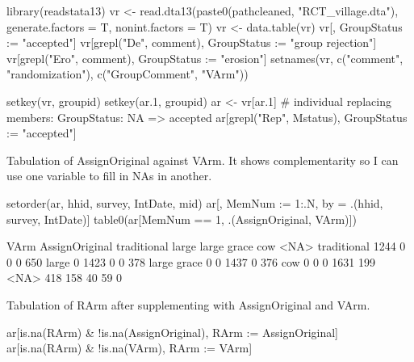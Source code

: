 \begin{Schunk}
\begin{Sinput}
library(readstata13)
vr <- read.dta13(paste0(pathcleaned, "RCT_village.dta"), 
  generate.factors = T, nonint.factors = T)
vr <- data.table(vr)
vr[, GroupStatus := "accepted"]
vr[grepl("De", comment), GroupStatus := "group rejection"]
vr[grepl("Ero", comment), GroupStatus := "erosion"]
setnames(vr, c("comment", "randomization"), c("GroupComment", "VArm"))
\end{Sinput}
\end{Schunk}
\begin{Schunk}
\end{Schunk}
\begin{Schunk}
\begin{Sinput}
setkey(vr, groupid)
setkey(ar.1, groupid)
ar <- vr[ar.1]
# individual replacing members: GroupStatus: NA => accepted
ar[grepl("Rep", Mstatus), GroupStatus := "accepted"]
\end{Sinput}
\end{Schunk}
Tabulation of \textsf{AssignOriginal} against \textsf{VArm}. It shows complementarity so I can use one variable to fill in NAs in another.
\begin{Schunk}
\begin{Sinput}
setorder(ar, hhid, survey, IntDate, mid)
ar[, MemNum := 1:.N, by = .(hhid, survey, IntDate)]
table0(ar[MemNum == 1, .(AssignOriginal, VArm)])
\end{Sinput}
\begin{Soutput}
              VArm
AssignOriginal traditional large large grace  cow <NA>
   traditional        1244     0           0    0  650
   large                 0  1423           0    0  378
   large grace           0     0        1437    0  376
   cow                   0     0           0 1631  199
   <NA>                418   158          40   59    0
\end{Soutput}
\end{Schunk}
Tabulation of \textsf{RArm} after supplementing with \textsf{AssignOriginal} and \textsf{VArm}.
\begin{Schunk}
\begin{Sinput}
ar[is.na(RArm) & !is.na(AssignOriginal), RArm := AssignOriginal]
ar[is.na(RArm) & !is.na(VArm), RArm := VArm]
\end{Sinput}
\end{Schunk}
